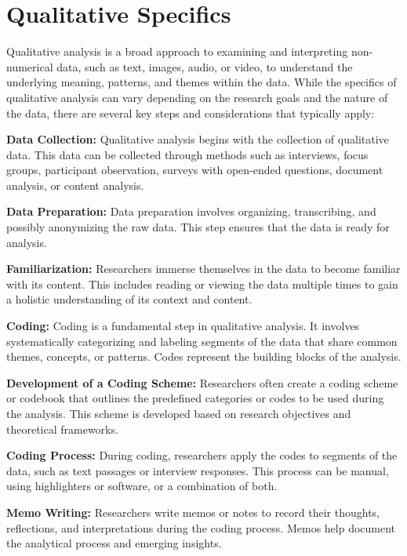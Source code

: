 \documentclass[
  b5paper]{book}
\begin{document}
\hypertarget{qualitative-specifics}{%
\section{Qualitative Specifics}\label{qualitative-specifics}}

Qualitative analysis is a broad approach to examining and interpreting non-numerical data, such as text, images, audio, or video, to understand the underlying meaning, patterns, and themes within the data. While the specifics of qualitative analysis can vary depending on the research goals and the nature of the data, there are several key steps and considerations that typically apply:

\textbf{Data Collection:} Qualitative analysis begins with the collection of qualitative data. This data can be collected through methods such as interviews, focus groups, participant observation, surveys with open-ended questions, document analysis, or content analysis.

\textbf{Data Preparation:} Data preparation involves organizing, transcribing, and possibly anonymizing the raw data. This step ensures that the data is ready for analysis.

\textbf{Familiarization:} Researchers immerse themselves in the data to become familiar with its content. This includes reading or viewing the data multiple times to gain a holistic understanding of its context and content.

\textbf{Coding:} Coding is a fundamental step in qualitative analysis. It involves systematically categorizing and labeling segments of the data that share common themes, concepts, or patterns. Codes represent the building blocks of the analysis.

\textbf{Development of a Coding Scheme:} Researchers often create a coding scheme or codebook that outlines the predefined categories or codes to be used during the analysis. This scheme is developed based on research objectives and theoretical frameworks.

\textbf{Coding Process:} During coding, researchers apply the codes to segments of the data, such as text passages or interview responses. This process can be manual, using highlighters or software, or a combination of both.

\textbf{Memo Writing:} Researchers write memos or notes to record their thoughts, reflections, and interpretations during the coding process. Memos help document the analytical process and emerging insights.
\end{document}
